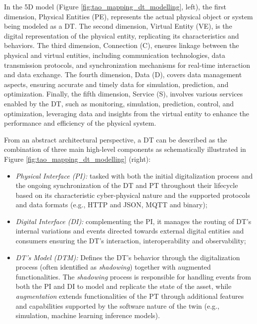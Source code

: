 In the 5D model (Figure \ref{fig:tao_mapping_dt_modelling}, left), the first dimension, Physical Entities (PE), represents the actual physical object or system being modeled as a DT. The second dimension, Virtual Entity (VE), is the digital representation of the physical entity, replicating its characteristics and behaviors.
The third dimension, Connection (C), ensures linkage between the physical and virtual entities, including communication technologies, data transmission protocols, and synchronization mechanisms for real-time interaction and data exchange.
The fourth dimension, Data (D), covers data management aspects, ensuring accurate and timely data for simulation, prediction, and optimization.
Finally, the fifth dimension, Service (S), involves various services enabled by the DT, such as monitoring, simulation, prediction, control, and optimization, leveraging data and insights from the virtual entity to enhance the performance and efficiency of the physical system.

From an abstract architectural perspective, a DT can be described as the combination of three main high-level components as schematically illustrated in Figure \ref{fig:tao_mapping_dt_modelling} (right): 

\begin{itemize}
    \item \textit{Physical Interface (PI):} tasked with both the initial digitalization process and the ongoing synchronization of the DT and PT throughout their lifecycle based on its characteristic cyber-physical nature and the supported protocols and data formats (e.g., HTTP and JSON, MQTT and binary);
    \item \textit{Digital Interface (DI):} complementing the PI, it manages the routing of DT's internal variations and events directed towards external digital entities and consumers ensuring the DT's interaction, interoperability and observability;
    \item  \textit{DT’s Model (DTM):} Defines the DT's behavior through the digitalization process (often identified as \textit{shadowing})\cite{web_of_dt} together with augmented functionalities.
    The \textit{shadowing} process is responsible for handling events from both the PI and DI to model and replicate the state of the asset, while \textit{augmentation} extends functionalities of the PT through additional features and capabilities supported by the software nature of the twin (e.g., simulation, machine learning inference models).
\end{itemize}


